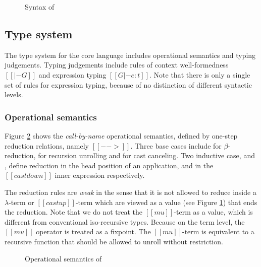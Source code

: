 \begin{figure}
    \gram{\otte\ottinterrule
        \ottG\ottinterrule
        \ottv}
    \caption{Syntax of \name}
    \label{fig:core:syntax}
\end{figure}

\subsection{Type system}\label{sec:core:type}
The type system for the core language includes operational semantics and typing judgements. Typing judgements include rules of context well-formedness $[[|- G]]$ and expression typing $[[G |- e : t]]$. Note that there is only a single set of rules for expression typing, because of no distinction of different syntactic levels.

\subsubsection{Operational semantics}
Figure \ref{fig:core:opsem} shows the \emph{call-by-name} operational semantics, defined by one-step reduction relations, namely $[[-->]]$. Three base cases include  for $\beta$-reduction,  for recursion unrolling and  for cast canceling. Two inductive case,  and , define reduction in the head position of an application, and in the $[[castdown]]$ inner expression respectively.

The reduction rules are \emph{weak} in the sense that it is not allowed to reduce inside a $\lambda$-term or $[[castup]]$-term which are viewed as a value (see Figure \ref{fig:core:syntax}) that ends the reduction. Note that we do not treat the $[[mu]]$-term as a value, which is different from conventional iso-recursive types. Because on the term level, the $[[mu]]$ operator is treated as a fixpoint. The $[[mu]]$-term is equivalent to a recursive function that should be allowed to unroll without restriction.

\begin{figure}
    \ottdefnstep{}
    \caption{Operational semantics of \name}
    \label{fig:core:opsem}
\end{figure}

